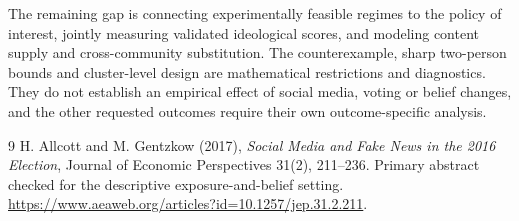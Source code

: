 \documentclass[11pt,a4paper]{article}
\begin{document}
The remaining gap is connecting experimentally feasible regimes to the policy of interest, jointly measuring validated ideological scores, and modeling content supply and cross-community substitution. The counterexample, sharp two-person bounds and cluster-level design are mathematical restrictions and diagnostics. They do not establish an empirical effect of social media, voting or belief changes, and the other requested outcomes require their own outcome-specific analysis.

\begin{thebibliography}{9}
 H. Allcott and M. Gentzkow (2017), \emph{Social Media and Fake News in the 2016 Election}, Journal of Economic Perspectives 31(2), 211--236. Primary abstract checked for the descriptive exposure-and-belief setting. \url{https://www.aeaweb.org/articles?id=10.1257/jep.31.2.211}.
\end{thebibliography}
\end{document}
